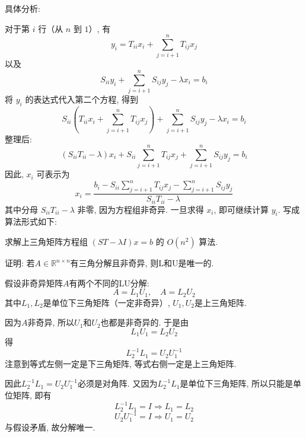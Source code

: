 \documentclass[12pt, answers]{exam}     %
\newcommand{\R}{\mathbb{R}}
\begin{document}
\begin{questions}
\begin{solution}
具体分析:

对于第 \(i\) 行（从 \(n\) 到 \(1\)）, 有
\[
y_i = T_{ii} x_i + \sum_{j=i+1}^{n} T_{ij} x_j
\]
以及
\[
S_{ii} y_i + \sum_{j=i+1}^{n} S_{ij} y_j - \lambda x_i = b_i
\]
将 \(y_i\) 的表达式代入第二个方程, 得到
\[
S_{ii} \left( T_{ii} x_i + \sum_{j=i+1}^{n} T_{ij} x_j \right) + \sum_{j=i+1}^{n} S_{ij} y_j - \lambda x_i = b_i
\]
整理后: 
\[
(S_{ii} T_{ii} - \lambda) x_i + S_{ii} \sum_{j=i+1}^{n} T_{ij} x_j + \sum_{j=i+1}^{n} S_{ij} y_j = b_i
\]
因此, \(x_i\) 可表示为
\[
x_i = \frac{ b_i - S_{ii} \sum_{j=i+1}^{n} T_{ij} x_j - \sum_{j=i+1}^{n} S_{ij} y_j }{ S_{ii} T_{ii} - \lambda }
\]
其中分母 \(S_{ii} T_{ii} - \lambda\) 非零, 因为方程组非奇异. 一旦求得 \(x_i\), 即可继续计算 \(y_i\). 写成算法形式如下:

\begin{algorithm}[H]
\caption{求解上三角矩阵方程组 \((ST - \lambda I)x = b\) 的 \(O(n^2)\) 算法.}
\end{algorithm}
\end{solution}

\question{}证明: 若$ A \in \R^{n \times n} $有三角分解且非奇异, 则L和U是唯一的.

\begin{solution}假设非奇异矩阵$A$有两个不同的LU分解: 
\[
A = L_1U_1, \quad A = L_2U_2
\]
其中$L_1,L_2$是单位下三角矩阵（一定非奇异）, $U_1,U_2$是上三角矩阵. 

因为$A$非奇异, 所以$U_1$和$U_2$也都是非奇异的. 于是由 
\[ L_1U_1 = L_2U_2 \]
得
\[ L_2^{-1}L_1 = U_2U_1^{-1} \]
注意到等式左侧一定是下三角矩阵, 等式右侧一定是上三角矩阵. 

因此$L_2^{-1}L_1 = U_2U_1^{-1}$必须是对角阵. 又因为$L_2^{-1}L_1$是单位下三角矩阵, 所以只能是单位矩阵, 即有
\[ L_2^{-1}L_1 = I \Rightarrow L_1 = L_2 \]
\[ U_2U_1^{-1} = I \Rightarrow U_1 = U_2 \]
与假设矛盾, 故分解唯一.
\end{solution}



\end{questions}
\end{document}
